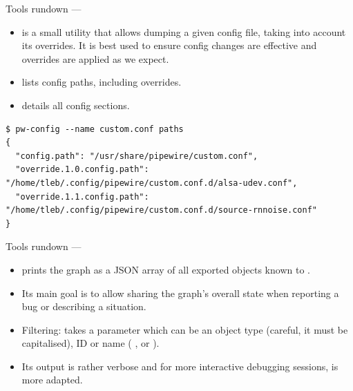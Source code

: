 \begin{frame}[fragile]{Tools rundown — }
  \begin{itemize}

  \item {} is a small utility that allows dumping a given
    config file, taking into account its overrides. It is best used to
    ensure config changes are effective and overrides are applied as we
    expect.

  \item {} lists config paths, including overrides.

  \item {} details all config sections.

  \end{itemize}

    \begin{block}{}
      \fontsize{8}{8}\selectfont
        \begin{verbatim}
$ pw-config --name custom.conf paths
{
  "config.path": "/usr/share/pipewire/custom.conf",
  "override.1.0.config.path": "/home/tleb/.config/pipewire/custom.conf.d/alsa-udev.conf",
  "override.1.1.config.path": "/home/tleb/.config/pipewire/custom.conf.d/source-rnnoise.conf"
}
        \end{verbatim}
      \end{block}
\end{frame}



\begin{frame}{Tools rundown — }
  \begin{itemize}

  \item {} prints the graph as a JSON array of all exported
    objects known to .

  \item Its main goal is to allow sharing the graph’s overall state
    when reporting a bug or describing a situation.

  \item Filtering:  takes a parameter which can be an
    object type (careful, it must be capitalised), ID or name (
    ,  or ).

  \item Its output is rather verbose and for more interactive debugging
    sessions,  is more adapted.

  \end{itemize}
\end{frame}



